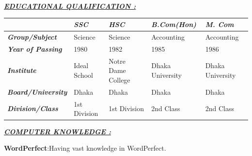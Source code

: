 \documentclass[12pt, a4paper]{article}
\begin{document}
\vspace{34pt}
\textbf{\textit{\underline{EDUCATIONAL QUALIFICATION :}}}

\vspace{14pt}
{
\setlength{\tabcolsep}{0.08in}
\setlength{\extrarowheight}{0.07in}
\setlength{\arrayrulewidth}{0.75pt}
\begin{tabular}{|p{1.49in}|p{1.19in}|p{1.19in}|p{0.99in}|p{1.14in}|}
\hline
& \textbf{\textit{SSC}} & \textbf{\textit{HSC}} & \textbf{\textit{B.Com(Hon)}} & \textbf{\textit{M. Com}} \\[0.05in]
\hline
\textbf{\textit{Group/Subject}} & Science & Science & Accounting & Accounting \\[0.05in]
\hline
\textbf{\textit{Year of Passing}} & 1980 & 1982 & 1985 & 1986 \\[0.05in]
\hline
\textbf{\textit{Institute}} & Ideal School & Notre Dame College & Dhaka University & Dhaka University \\[0.05in]
\hline
\textbf{\textit{Board/University}} & Dhaka & Dhaka & Dhaka & Dhaka \\[0.05in]
\hline
\textbf{\textit{Division/Class}} & 1st Division & 1st Division & 2nd Class & 2nd Class \\[0.05in]
\hline
\end{tabular}
}

\vspace{51pt}
\textbf{\textit{\underline{COMPUTER KNOWLEDGE :}}}

\vspace{17pt}
\textbf{WordPerfect}\hspace*{0.9in}:\hspace*{0.2in}Having vast knowledge in WordPerfect.
\end{document}
